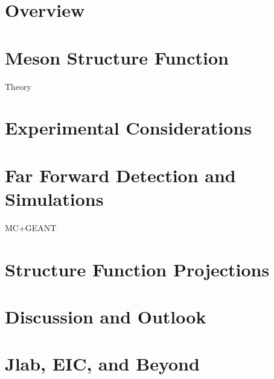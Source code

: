 \documentclass[
]{report}
\begin{document}
\label{Chapter-9}

\hypertarget{Section-9.1}{%
\section{Overview}\label{Section-9.1}}

\hypertarget{Section-9.2}{%
\section{Meson Structure Function}\label{Section-9.2}}

Theory

\hypertarget{Section-9.3}{%
\section{Experimental Considerations}\label{Section-9.3}}

\hypertarget{Section-9.4}{%
\section{Far Forward Detection and Simulations}\label{Section-9.4}}

MC+GEANT

\hypertarget{Section-9.5}{%
\section{Structure Function Projections}\label{Section-9.5}}

\hypertarget{Section-9.6}{%
\section{Discussion and Outlook}\label{Section-9.6}}

\label{Chapter-10}

\hypertarget{Section-10.1}{%
\section{Jlab, EIC, and Beyond}\label{Section-10.1}}
\end{document}
